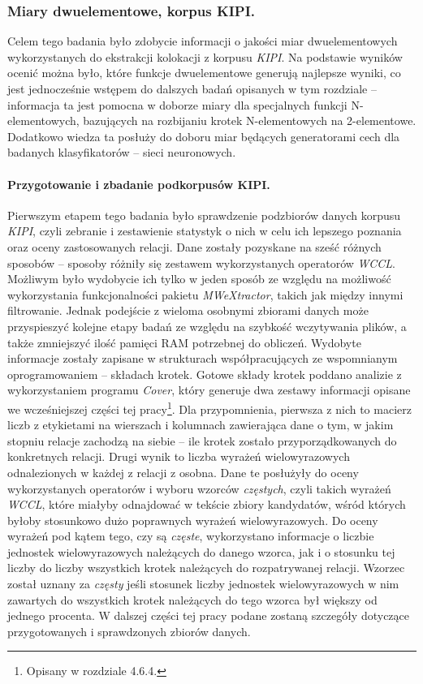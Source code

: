 \documentclass[11pt,a4paper]{llncs}
\begin{document}
\subsubsection{Miary dwuelementowe, korpus KIPI.}
Celem tego badania było zdobycie informacji o jakości miar dwuelementowych wykorzystanych do ekstrakcji kolokacji z korpusu \emph{KIPI}.
Na podstawie wyników ocenić można było, które funkcje dwuelementowe generują najlepsze wyniki, co jest jednocześnie wstępem do dalszych badań opisanych w tym rozdziale -- informacja ta jest pomocna w doborze miary dla specjalnych funkcji N-elementowych, bazujących na rozbijaniu krotek N-elementowych na 2-elementowe.
Dodatkowo wiedza ta posłuży do doboru miar będących generatorami cech dla badanych klasyfikatorów -- sieci neuronowych.

\paragraph{Przygotowanie i zbadanie podkorpusów KIPI.}
Pierwszym etapem tego badania było sprawdzenie podzbiorów danych korpusu \emph{KIPI}, czyli zebranie i zestawienie statystyk o nich w celu ich lepszego poznania oraz oceny zastosowanych relacji.
Dane zostały pozyskane na sześć różnych sposobów -- sposoby różniły się zestawem wykorzystanych operatorów \emph{WCCL}.
Możliwym było wydobycie ich tylko w jeden sposób ze względu na możliwość wykorzystania funkcjonalności pakietu \emph{MWeXtractor}, takich jak między innymi filtrowanie.
Jednak podejście z wieloma osobnymi zbiorami danych może przyspieszyć kolejne etapy badań ze względu na szybkość wczytywania plików, a także zmniejszyć ilość pamięci RAM potrzebnej do obliczeń.
Wydobyte informacje zostały zapisane w strukturach współpracujących ze wspomnianym oprogramowaniem -- składach krotek.
Gotowe składy krotek poddano analizie z wykorzystaniem programu \emph{Cover}, który generuje dwa zestawy informacji opisane we wcześniejszej części tej pracy\footnote{Opisany w rozdziale 4.6.4.}.
Dla przypomnienia, pierwsza z nich to macierz liczb z etykietami na wierszach i kolumnach zawierająca dane o tym, w jakim stopniu relacje zachodzą na siebie -- ile krotek zostało przyporządkowanych do konkretnych relacji.
Drugi wynik to liczba wyrażeń wielowyrazowych odnalezionych w każdej z relacji z osobna.
Dane te posłużyły do oceny wykorzystanych operatorów i wyboru wzorców \emph{częstych}, czyli takich wyrażeń \emph{WCCL}, które miałyby odnajdować w tekście zbiory kandydatów, wśród których byłoby stosunkowo dużo poprawnych wyrażeń wielowyrazowych.
Do oceny wyrażeń pod kątem tego, czy są \emph{częste}, wykorzystano informacje o liczbie jednostek wielowyrazowych należących do danego wzorca, jak i o stosunku tej liczby do liczby wszystkich krotek należących do rozpatrywanej relacji.
Wzorzec został uznany za \emph{częsty} jeśli stosunek liczby jednostek wielowyrazowych w nim zawartych do wszystkich krotek należących do tego wzorca był większy od jednego procenta.
W dalszej części tej pracy podane zostaną szczegóły dotyczące przygotowanych i sprawdzonych zbiorów danych.
\end{document}
